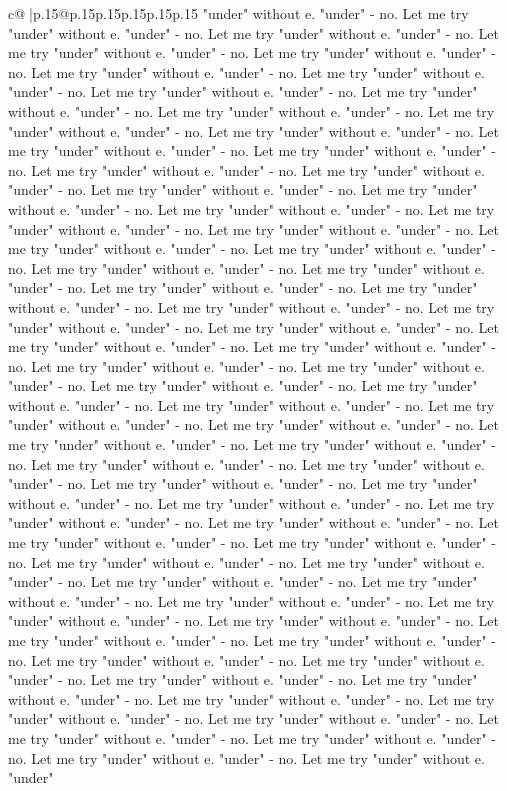 \documentclass{article}
\begin{document}
{\begin{supertabular}{c@{$\;$}|p{.15\linewidth}@{}p{.15\linewidth}p{.15\linewidth}p{.15\linewidth}p{.15\linewidth}p{.15\linewidth}}
{{{"under" without e. "under" {-} no. Let me try "under" without e. "under" {-} no. Let me try "under" without e. "under" {-} no. Let me try "under" without e. "under" {-} no. Let me try "under" without e. "under" {-} no. Let me try "under" without e. "under" {-} no. Let me try "under" without e. "under" {-} no. Let me try "under" without e. "under" {-} no. Let me try "under" without e. "under" {-} no. Let me try "under" without e. "under" {-} no. Let me try "under" without e. "under" {-} no. Let me try "under" without e. "under" {-} no. Let me try "under" without e. "under" {-} no. Let me try "under" without e. "under" {-} no. Let me try "under" without e. "under" {-} no. Let me try "under" without e. "under" {-} no. Let me try "under" without e. "under" {-} no. Let me try "under" without e. "under" {-} no. Let me try "under" without e. "under" {-} no. Let me try "under" without e. "under" {-} no. Let me try "under" without e. "under" {-} no. Let me try "under" without e. "under" {-} no. Let me try "under" without e. "under" {-} no. Let me try "under" without e. "under" {-} no. Let me try "under" without e. "under" {-} no. Let me try "under" without e. "under" {-} no. Let me try "under" without e. "under" {-} no. Let me try "under" without e. "under" {-} no. Let me try "under" without e. "under" {-} no. Let me try "under" without e. "under" {-} no. Let me try "under" without e. "under" {-} no. Let me try "under" without e. "under" {-} no. Let me try "under" without e. "under" {-} no. Let me try "under" without e. "under" {-} no. Let me try "under" without e. "under" {-} no. Let me try "under" without e. "under" {-} no. Let me try "under" without e. "under" {-} no. Let me try "under" without e. "under" {-} no. Let me try "under" without e. "under" {-} no. Let me try "under" without e. "under" {-} no. Let me try "under" without e. "under" {-} no. Let me try "under" without e. "under" {-} no. Let me try "under" without e. "under" {-} no. Let me try "under" without e. "under" {-} no. Let me try "under" without e. "under" {-} no. Let me try "under" without e. "under" {-} no. Let me try "under" without e. "under" {-} no. Let me try "under" without e. "under" {-} no. Let me try "under" without e. "under" {-} no. Let me try "under" without e. "under" {-} no. Let me try "under" without e. "under" {-} no. Let me try "under" without e. "under" {-} no. Let me try "under" without e. "under" {-} no. Let me try "under" without e. "under" {-} no. Let me try "under" without e. "under" {-} no. Let me try "under" without e. "under" {-} no. Let me try "under" without e. "under" {-} no. Let me try "under" without e. "under" {-} no. Let me try "under" without e. "under" {-} no. Let me try "under" without e. "under" {-} no. Let me try "under" without e. "under" {-} no. Let me try "under" without e. "under" {-} no. Let me try "under" without e. "under" {-} no. Let me try "under" without e. "under" {-} no. Let me try "under" without e. "under" {-} no. Let me try "under" without e. "under" {-} no. Let me try "under" without e. "under" {-} no. Let me try "under" without e. "under" {-} no. Let me try "under" without e. "under" {-} no. Let me try "under" without e. "under" }}}
\end{supertabular}}
\end{document}
